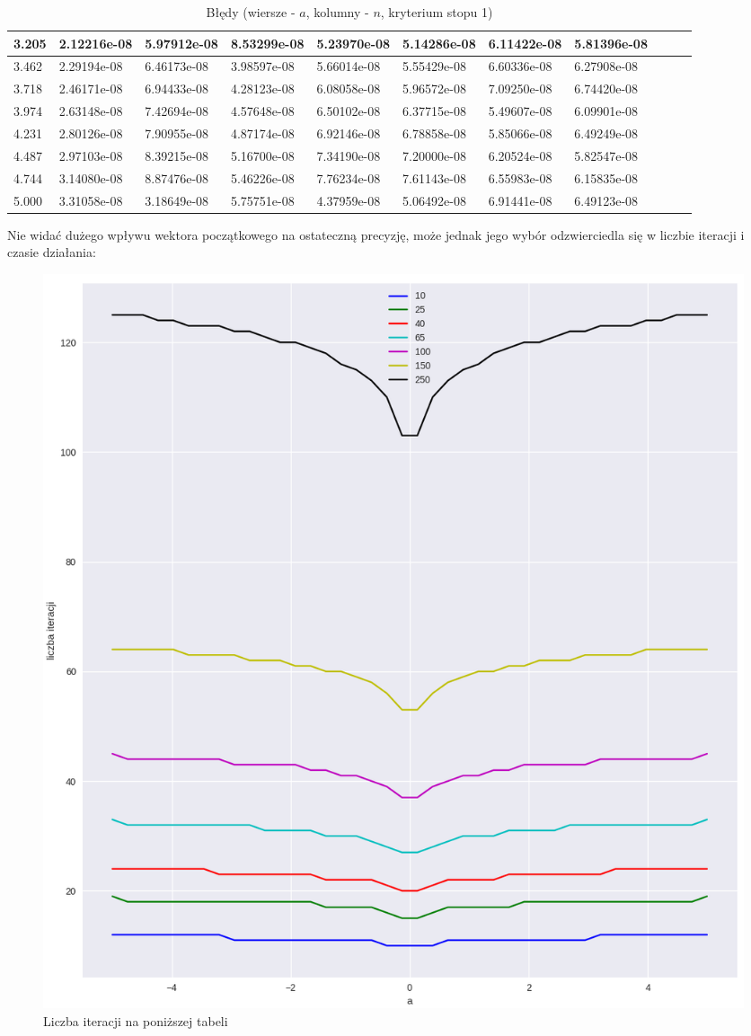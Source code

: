 \documentclass{article}
\begin{document}
\begin{table}[H]
\begin{adjustwidth}{-0.9in}{-.7in}
\begin{tabular}{|l|l|l|l|l|l|l|l|l|l|l|}
3.205 & 2.12216e-08 & 5.97912e-08 & 8.53299e-08 & 5.23970e-08 & 5.14286e-08 & 6.11422e-08 & 5.81396e-08 \\ \hline
3.462 & 2.29194e-08 & 6.46173e-08 & 3.98597e-08 & 5.66014e-08 & 5.55429e-08 & 6.60336e-08 & 6.27908e-08 \\ \hline
3.718 & 2.46171e-08 & 6.94433e-08 & 4.28123e-08 & 6.08058e-08 & 5.96572e-08 & 7.09250e-08 & 6.74420e-08 \\ \hline
3.974 & 2.63148e-08 & 7.42694e-08 & 4.57648e-08 & 6.50102e-08 & 6.37715e-08 & 5.49607e-08 & 6.09901e-08 \\ \hline
4.231 & 2.80126e-08 & 7.90955e-08 & 4.87174e-08 & 6.92146e-08 & 6.78858e-08 & 5.85066e-08 & 6.49249e-08 \\ \hline
4.487 & 2.97103e-08 & 8.39215e-08 & 5.16700e-08 & 7.34190e-08 & 7.20000e-08 & 6.20524e-08 & 5.82547e-08 \\ \hline
4.744 & 3.14080e-08 & 8.87476e-08 & 5.46226e-08 & 7.76234e-08 & 7.61143e-08 & 6.55983e-08 & 6.15835e-08 \\ \hline
5.000 & 3.31058e-08 & 3.18649e-08 & 5.75751e-08 & 4.37959e-08 & 5.06492e-08 & 6.91441e-08 & 6.49123e-08 \\ \hline
\end{tabular}
\end{adjustwidth}
\caption{Błędy (wiersze - $a$, kolumny - $n$, kryterium stopu 1)}
\end{table}

Nie widać dużego wpływu wektora początkowego na ostateczną precyzję, może jednak jego wybór odzwierciedla się w liczbie iteracji
i czasie działania:

\begin{figure}[H]
    \centering
    \includegraphics[width=\textwidth]{img/plot_7.png}
    \caption{Liczba iteracji na poniższej tabeli}
\end{figure}
\end{document}
